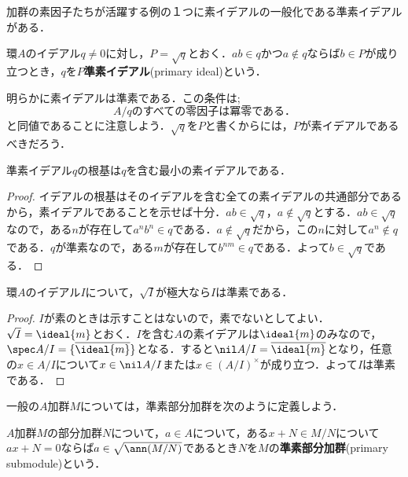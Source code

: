 加群の素因子たちが活躍する例の１つに素イデアルの一般化である準素イデアルがある．

\begin{defi}[準素イデアル]
	環$A$のイデアル$q\neq0$に対し，$P=\sqrt{q}$とおく．$ab\in q$かつ$a\not\in q$ならば$b\in P$が成り立つとき，$q$を$P$\textbf{準素イデアル}(primary ideal)という．
\end{defi}

明らかに素イデアルは準素である．この条件は;
\[A/q\text{のすべての零因子は冪零である．}\]
と同値であることに注意しよう．$\sqrt{q}$を$P$と書くからには，$P$が素イデアルであるべきだろう．

\begin{prop}
	準素イデアル$q$の根基は$q$を含む最小の素イデアルである．
\end{prop}

\begin{proof}
	イデアルの根基はそのイデアルを含む全ての素イデアルの共通部分であるから，素イデアルであることを示せば十分．$ab\in\sqrt{ q}，a\not\in\sqrt{ q}$とする．$ab\in\sqrt{ q}$なので，ある$n$が存在して$a^nb^n\in q$である．$a\not\in\sqrt{ q}$だから，この$n$に対して$a^n\not\in q$である．$ q$が準素なので，ある$m$が存在して$b^{nm}\in q$である．よって$b\in\sqrt{ q}$である．
\end{proof}

\begin{prop}\label{prop:sqrt{I}が極大なら準素}
	環$A$のイデアル$I$について，$\sqrt{I}$が極大なら$I$は準素である．
\end{prop}

\begin{proof}
	$I$が素のときは示すことはないので，素でないとしてよい．$\sqrt{I}=\ideal{m}$とおく．$I$を含む$A$の素イデアルは$\ideal{m}$のみなので，$\spec A/I=\{\bar{\ideal{m}}\}$となる．すると$\nil A/I=\bar{\ideal{m}}$となり，任意の$x\in A/I$について$x\in\nil A/I$または$x\in (A/I)^\times$が成り立つ．よって$I$は準素である．
\end{proof}

一般の$A$加群$M$については，準素部分加群を次のように定義しよう．

\begin{defi}\label{defi:準素加群}
	$A$加群$M$の部分加群$N$について，$a\in A$について，ある$x+N\in M/N$について$ax+N=0$ならば$a\in\sqrt{\ann (M/N)}$であるとき$N$を$M$の\textbf{準素部分加群}(primary submodule)という．
\end{defi}


